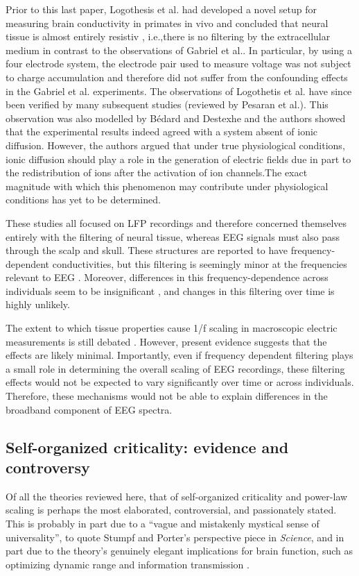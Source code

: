 Prior to this last paper, Logothesis et al.\cite{Logothetis2007} had developed a novel setup for measuring brain conductivity in primates in vivo and concluded that neural tissue is almost entirely resistiv , i.e.,there is no filtering by the extracellular medium in contrast to the observations of Gabriel et al.\cite{Gabriel1996}. In particular, by using a four electrode system, the electrode pair used to measure voltage was not subject to charge accumulation and therefore did not suffer from the confounding effects in the Gabriel et al. experiments. The observations of Logothetis et al. have since been verified by many subsequent studies (reviewed by Pesaran et al.\cite{Pesaran2018}). This observation was also modelled by Bédard and Destexhe\cite{Bedard2006a} and the authors showed that the experimental results indeed agreed with a system absent of ionic diffusion. However, the authors argued that under true physiological conditions, ionic diffusion should play a role in the generation of electric fields due in part to the redistribution of ions after the activation of ion channels.The exact magnitude with which this phenomenon may contribute under physiological conditions has yet to be determined.

These studies all focused on LFP recordings and therefore concerned themselves entirely with the filtering of neural tissue, whereas EEG signals must also pass through the scalp and skull. These structures are reported to have frequency-dependent conductivities, but this filtering is seemingly minor at the frequencies relevant to EEG \cite{Pfurtscheller1975, Akhtari2002, Pesaran2018}. Moreover, differences in this frequency-dependence across individuals seem to be insignificant \cite{Akhtari2002}, and changes in this filtering over time is highly unlikely. 

The extent to which tissue properties cause 1/f scaling in macroscopic electric measurements is still debated \cite{Bedard2017}. However, present evidence suggests that the effects are likely minimal. Importantly, even if frequency dependent filtering plays a small role in determining the overall scaling of EEG recordings, these filtering effects would not be expected to vary significantly over time or across individuals. Therefore, these mechanisms would not be able to explain differences in the broadband component of EEG spectra. 

\subsection{Self-organized criticality: evidence and controversy}
Of all the theories reviewed here, that of self-organized criticality and power-law scaling is perhaps the most elaborated, controversial, and passionately stated. This is probably in part due to a “vague and mistakenly mystical sense of universality”, to quote Stumpf and Porter’s perspective piece in \textit{Science}\cite{Stumpf2012}, and in part due to the theory’s genuinely elegant implications for brain function, such as optimizing dynamic range \cite{Kinouchi2006} and information transmission \cite{Shriki2016}. 


